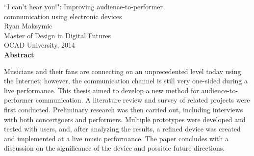 \begin{center}
{``I can't hear you!": Improving audience-to-performer\\communication using electronic devices\\[0.25cm]
Ryan Maksymic\\[0.25cm]
Master of Design in Digital Futures\\[0.25cm]
OCAD University, 2014\\[0.75cm]
\large\textbf{Abstract}}\\
\end{center}

Musicians and their fans are connecting on an unprecedented level today using the Internet; however, the communication channel is still very one-sided during a live performance. This thesis aimed to develop a new method for audience-to-performer communication. A literature review and survey of related projects were first conducted. Preliminary research was then carried out, including interviews with both concertgoers and performers. Multiple prototypes were developed and tested with users, and, after analyzing the results, a refined device was created and implemented at a live music performance. The paper concludes with a discussion on the significance of the device and possible future directions.